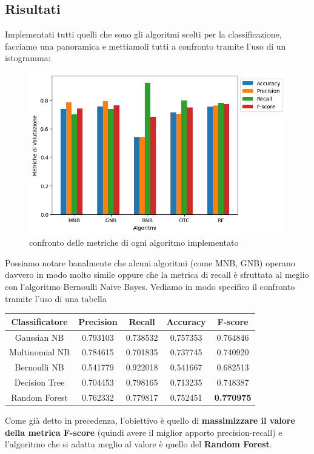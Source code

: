 \documentclass{article}
\begin{document}
\begin{titlepage}
        \subsection{Risultati}
        Implementati tutti quelli che sono gli algoritmi scelti per la classificazione, facciamo una panoramica e mettiamoli tutti a confronto tramite l'uso di un istogramma:
        \begin{figure}[ht]
            \centering
            \includegraphics[width=0.6\linewidth]{comparison.png}
            \caption{  confronto delle metriche di ogni algoritmo implementato}
            \label{fig:enter-label}
        \end{figure}
        \newpage
            Possiamo notare banalmente che alcuni algoritmi (come MNB, GNB) operano davvero in modo molto simile oppure che la metrica di recall è sfruttata al meglio con l'algoritmo Bernoulli Naive Bayes. Vediamo in modo specifico il confronto tramite l'uso di una tabella
        \begin{center}
        \begin{tabular}{|c|c|c|c|c|}
            \hline
            \textbf{Classificatore} & \textbf{Precision} & \textbf{Recall} & \textbf{Accuracy}& \textbf{F-score}\\ \hline
            Gaussian NB & 0.793103 & 0.738532 & 0.757353 & 0.764846\\ \hline
            Multinomial NB & 0.784615 & 0.701835 & 0.737745 & 0.740920\\ \hline
            Bernoulli NB & 0.541779 & 0.922018 & 0.541667 & 0.682513\\ \hline
            Decision Tree & 0.704453 & 0.798165 & 0.713235 & 0.748387\\\hline
             Random Forest & 0.762332 & 0.779817 & 0.752451 & \textbf{0.770975}\\ 
            \hline
        \end{tabular}
        \end{center}
       Come già detto in precedenza, l'obiettivo è quello di \textbf{massimizzare il valore della metrica F-score} (quindi avere il miglior apporto precision-recall) e l'algoritmo che si adatta meglio al valore è quello del \textbf{Random Forest}.
       \newpage

\end{titlepage}
\end{document}
